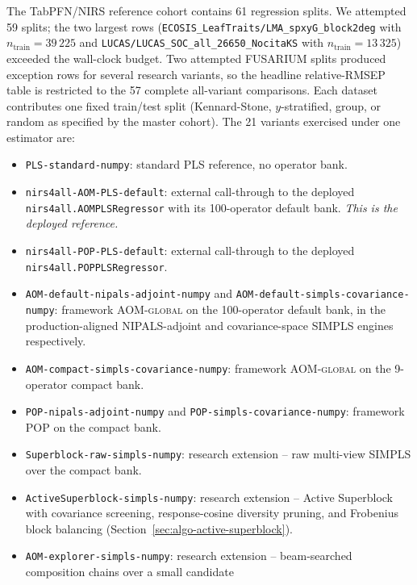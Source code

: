 \documentclass[review,a4paper]{elsarticle}
\newcommand{\AOM}{\textsc{AOM}\xspace}
\newcommand{\POP}{\textsc{POP}\xspace}
\newcommand{\PLS}{\textsc{PLS}\xspace}
\newcommand{\NIPALS}{\textsc{NIPALS}\xspace}
\newcommand{\SIMPLS}{\textsc{SIMPLS}\xspace}
\begin{document}
The TabPFN/NIRS reference cohort contains 61 regression splits. We
attempted 59 splits; the two largest rows
(\texttt{ECOSIS\_LeafTraits/LMA\_spxyG\_block2deg} with
$n_\text{train}=39\,225$ and
\texttt{LUCAS/LUCAS\_SOC\_all\_26650\_NocitaKS} with
$n_\text{train}=13\,325$) exceeded the wall-clock budget. Two attempted
FUSARIUM splits produced exception rows for several research variants,
so the headline relative-RMSEP table is restricted to the 57 complete
all-variant comparisons. Each dataset contributes one fixed train/test
split (Kennard-Stone, $y$-stratified, group, or random as specified by
the master cohort). The 21 variants exercised under one estimator are:

\begin{itemize}[leftmargin=2em,itemsep=0pt]
  \item \texttt{PLS-standard-numpy}: standard \PLS reference, no
        operator bank.
  \item \texttt{nirs4all-AOM-PLS-default}: external call-through to the
        deployed \verb|nirs4all.AOMPLSRegressor| with its 100-operator
        default bank. \emph{This is the deployed reference.}
  \item \texttt{nirs4all-POP-PLS-default}: external call-through to the
        deployed \verb|nirs4all.POPPLSRegressor|.
  \item \texttt{AOM-default-nipals-adjoint-numpy} and
        \texttt{AOM-default-simpls-covariance-numpy}: framework
        \AOM-\textsc{global} on the 100-operator default bank, in the
        production-aligned \NIPALS-adjoint and covariance-space
        \SIMPLS engines respectively.
  \item \texttt{AOM-compact-simpls-covariance-numpy}: framework
        \AOM-\textsc{global} on the 9-operator compact bank.
  \item \texttt{POP-nipals-adjoint-numpy} and
        \texttt{POP-simpls-covariance-numpy}: framework \POP on the
        compact bank.
  \item \texttt{Superblock-raw-simpls-numpy}: research extension --
        raw multi-view \SIMPLS over the compact bank.
  \item \texttt{ActiveSuperblock-simpls-numpy}: research extension --
        Active Superblock with covariance screening, response-cosine
        diversity pruning, and Frobenius block balancing
        (Section~\ref{sec:algo-active-superblock}).
  \item \texttt{AOM-explorer-simpls-numpy}: research extension --
        beam-searched composition chains over a small candidate

\end{itemize}
\end{document}
